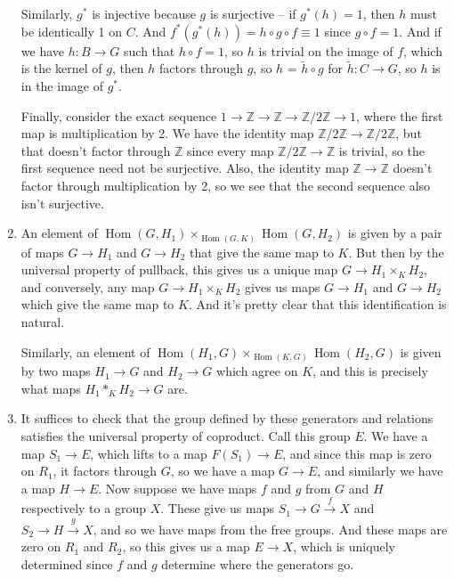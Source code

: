 \documentclass{article}
\newcommand\ZZ{\mathbb Z}
\newcommand\Zm[1]{\ZZ/#1\ZZ}
\DeclareMathOperator\Hom{Hom}
\begin{document}
\begin{enumerate}
      Similarly, $g^*$ is injective because $g$ is surjective -- if $g^*(h) =
      1$, then $h$ must be identically 1 on $C$. And $f^*(g^*(h)) = h \circ g
      \circ f \equiv 1$ since $g \circ f = 1$. And if we have $h : B \to G$ such
      that $h \circ f = 1$, so $h$ is trivial on the image of $f$, which is the
      kernel of $g$, then $h$ factors through $g$, so $h$ = $\tilde h \circ g$
      for $\tilde h : C \to G$, so $h$ is in the image of $g^*$.

      Finally, consider the exact sequence $1 \to \ZZ \to \ZZ \to \Zm2 \to 1$,
      where the first map is multiplication by 2. We have the identity map $\Zm2
      \to \Zm2$, but that doesn't factor through $\ZZ$ since every map $\Zm2 \to
      \ZZ$ is trivial, so the first sequence need not be surjective. Also, the
      identity map $\ZZ \to \ZZ$ doesn't factor through multiplication by 2, so
      we see that the second sequence also isn't surjective.

   \item An element of $\Hom(G,H_1) \times_{\Hom(G,K)} \Hom(G,H_2)$ is given by
      a pair of maps $G \to H_1$ and $G \to H_2$ that give the same map to $K$.
      But then by the universal property of pullback, this gives us a unique map
      $G \to H_1 \times_K H_2$, and conversely, any map $G \to H_1 \times_K H_2$
      gives us maps $G \to H_1$ and $G \to H_2$ which give the same map to $K$.
      And it's pretty clear that this identification is natural.

      Similarly, an element of $\Hom(H_1,G) \times_{\Hom(K,G)} \Hom(H_2,G)$
      is given by two maps $H_1 \to G$ and $H_2 \to G$ which agree on $K$, and
      this is precisely what maps $H_1 *_K H_2 \to G$ are.

   \item It suffices to check that the group defined by these generators and
      relations satisfies the universal property of coproduct. Call this group
      $E$. We have a map $S_1 \to E$, which lifts to a map $F(S_1) \to E$, and
      since this map is zero on $R_1$, it factors through $G$, so we have a map
      $G \to E$, and similarly we have a map $H \to E$. Now suppose we have maps
      $f$ and $g$ from $G$ and $H$ respectively to a group $X$. These give us
      maps $S_1 \to G \stackrel{f}\to X$ and $S_2 \to H \stackrel{g}\to X$, and
      so we have maps from the free groups. And these maps are zero on $R_1$ and
      $R_2$, so this gives us a map $E \to X$, which is uniquely determined
      since $f$ and $g$ determine where the generators go.

\end{enumerate}
\end{document}
